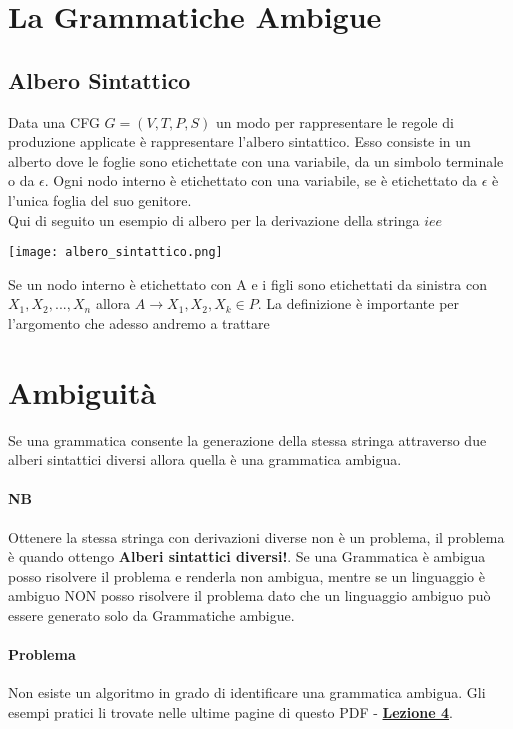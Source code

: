 \section{La Grammatiche Ambigue}
\subsection{Albero Sintattico}
Data una CFG $G= (V,T,P,S)$ un modo per rappresentare le regole di produzione applicate è rappresentare l'albero sintattico.
Esso consiste in un alberto dove le foglie sono etichettate con una variabile, da un simbolo
terminale o da $\epsilon$. Ogni nodo interno è etichettato con una variabile, 
se è etichettato da $\epsilon$ è l'unica foglia del suo genitore.
\\ Qui di seguito un esempio di albero per la derivazione della stringa $iee$
\begin{center}
    \texttt{[image: albero\_sintattico.png]}
\end{center}
Se un nodo interno è etichettato con A e i figli sono etichettati da sinistra
con $X_1, X_2, ..., X_n$ allora $A \rightarrow X_1, X_2, X_k \in P$.
La definizione è importante per l'argomento che adesso andremo a trattare
\section*{Ambiguità}
Se una grammatica consente la generazione della stessa stringa attraverso due alberi sintattici
diversi allora quella è una grammatica ambigua.
\paragraph*{NB} Ottenere la stessa stringa con derivazioni diverse non è un problema,
il problema è quando ottengo \textbf{Alberi sintattici diversi!}.
Se una Grammatica è ambigua posso risolvere il problema e renderla non ambigua, mentre
se un linguaggio è ambiguo NON posso risolvere il problema dato che
un linguaggio ambiguo può essere generato solo da Grammatiche ambigue.
\paragraph*{Problema} Non esiste un algoritmo in grado di identificare una grammatica
ambigua. Gli esempi pratici li trovate nelle ultime pagine di questo PDF - 
{\href{https://drive.google.com/drive/folders/1gdH43dnEfCeLGmq08HEBwQoKORGgcQdY}{\textbf{Lezione 4}}}.

